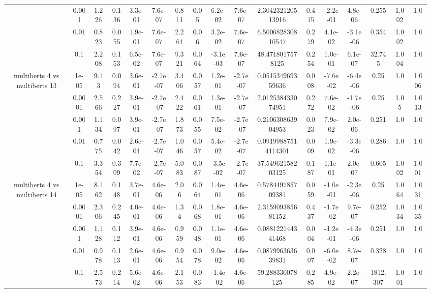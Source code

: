 \begin{tabular}{|c|c|c|c|c|c|c|c|c|c|c|c|c|c|c|c|c|}
 & 0.001 & 1.226 & 0.136 & 3.3e-01 & 7.6e-07 & 0.811 & 0.05 & 6.2e-02 & 7.6e-07 & 2.304232120513916 & 0.415 & -2.2e-01 & 4.8e-06 & 0.255 & 1.002 & 1.0 \\
 & 0.01 & 0.823 & 0.055 & 1.9e-01 & 7.6e-07 & 2.264 & 0.06 & 3.2e-02 & 7.6e-07 & 6.500682830810547 & 0.279 & 4.1e-02 & -3.1e-06 & 0.354 & 1.002 & 1.0 \\
 & 0.1 & 2.208 & 0.153 & 6.5e-02 & 7.6e-07 & 9.321 & 0.064 & -3.1e-03 & 7.6e-07 & 48.4718017578125 & 0.254 & 1.0e-01 & 6.1e-07 & 32.745 & 1.004 & 1.0 \\
\hline
\multirow{5}{*}{multiberts 4 vs multiberts 13} & 1e-05 & 9.13 & 0.094 & 3.6e-01 & -2.7e-07 & 3.406 & 0.057 & 1.2e-01 & -2.7e-07 & 0.051534969359636 & 0.008 & -7.6e-02 & -6.4e-06 & 0.25 & 1.0 & 1.006 \\
 & 0.0001 & 2.566 & 0.227 & 3.9e-01 & -2.7e-07 & 2.422 & 0.061 & 1.3e-01 & -2.7e-07 & 2.012538433074951 & 0.272 & 7.6e-02 & -1.7e-06 & 0.25 & 1.05 & 1.013 \\
 & 0.001 & 1.134 & 0.097 & 3.9e-01 & -2.7e-07 & 1.873 & 0.055 & 7.5e-02 & -2.7e-07 & 0.210630863904953 & 0.023 & 7.9e-02 & 2.0e-06 & 0.251 & 1.0 & 1.0 \\
 & 0.01 & 0.775 & 0.042 & 2.6e-01 & -2.7e-07 & 1.046 & 0.057 & 5.4e-02 & -2.7e-07 & 0.09199887514114301 & 0.009 & 1.9e-02 & -3.3e-06 & 0.286 & 1.0 & 1.0 \\
 & 0.1 & 3.354 & 0.309 & 7.7e-02 & -2.7e-07 & 5.083 & 0.087 & -3.5e-02 & -2.7e-07 & 37.54962158203125 & 0.187 & 1.1e-01 & 2.0e-07 & 0.605 & 1.002 & 1.001 \\
\hline
\multirow{5}{*}{multiberts 4 vs multiberts 14} & 1e-05 & 8.162 & 0.148 & 3.7e-01 & 4.6e-06 & 2.06 & 0.064 & 1.4e-01 & 4.6e-06 & 0.578449785709381 & 0.059 & -1.0e-01 & -2.3e-06 & 0.25 & 1.064 & 1.031 \\
 & 0.0001 & 2.306 & 0.245 & 4.0e-01 & 4.6e-06 & 1.34 & 0.068 & 1.8e-01 & 4.6e-06 & 2.315909385681152 & 0.437 & -1.7e-02 & 9.7e-07 & 0.252 & 1.034 & 1.035 \\
 & 0.001 & 1.128 & 0.112 & 3.9e-01 & 4.6e-06 & 0.959 & 0.048 & 1.1e-01 & 4.6e-06 & 0.088122144341468 & 0.004 & -1.2e-01 & -4.3e-06 & 0.251 & 1.0 & 1.0 \\
 & 0.01 & 0.978 & 0.113 & 2.6e-01 & 4.6e-06 & 0.954 & 0.078 & 9.0e-02 & 4.6e-06 & 0.087996363639831 & 0.007 & -6.0e-02 & 8.7e-07 & 0.328 & 1.0 & 1.0 \\
 & 0.1 & 2.573 & 0.214 & 5.6e-02 & 4.6e-06 & 2.153 & 0.083 & -1.4e-02 & 4.6e-06 & 59.288330078125 & 0.285 & 4.9e-02 & 2.2e-07 & 1812.307 & 1.001 & 1.0 \\

\end{tabular}
